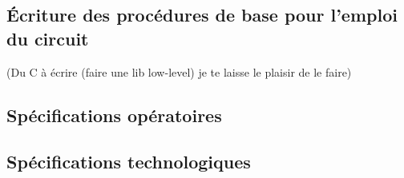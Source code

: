 \subsection{Écriture des procédures de base pour l'emploi du circuit}

(Du C à écrire (faire une lib low-level) je te laisse le plaisir de le faire)\\

\subsection{Spécifications opératoires}
\subsection{Spécifications technologiques}